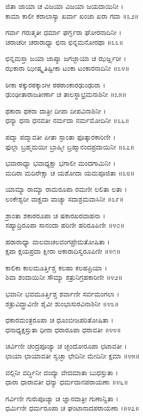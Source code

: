 ಜಿತಾ ಜಾಯಾ ಚ ವಿಜಯಾ ವಿಜಯಾ ಜಯದಾಯಿನೀ ।\\
ಕಾಮಾ ಕಾಲೀ ಕರಾಲಾಸ್ಯಾ ಖರ್ವಾ ಖಂಜಾ ಖರಾ ಗದಾ ॥೩೨॥

ಗರ್ವಾ ಗರುತ್ಮತೀ ಧರ್ಮಾ ಘರ್ಗ್ಘರಾ ಘೋರನಾದಿನೀ ।\\
ಚರಾಚರೀ ಚರಾರಾಧ್ಯಾ ಛಿನಾ ಛಿನ್ನಮನೋರಥಾ ॥೩೩॥

ಛಿನ್ನಮಸ್ತಾ ಜಯಾ ಜಾಪ್ಯಾ ಜಗಜ್ಜಾಯಾ ಚ ಝರ್ಜ್ಝರೀ ।\\
ಝಕಾರಾ ಝೀಷ್ಕೃತಿಷ್ಟೀಕಾ ಟಂಕಾ ಟಂಕಾರನಾದಿನೀ ॥೩೪॥

ಠೀಕಾ ಠಕ್ಕುರಠಕ್ಕಾಂಗೀ ಠಠಠಾಂಕಾರಢುಂಢುರಾ ।\\
ಢುಂಢೀತಾರಾಜತೀರ್ಣಾ ಚ ತಾಲಸ್ಥಾಭ್ರಮನಾಶಿನೀ ॥೩೫॥

ಥಕಾರಾ ಥಕರಾ ದಾತ್ರೀ ದೀಪಾ ದೀಪವಿನಾಶಿನೀ ।\\
ಧನ್ಯಾ ಧನಾ ಧನವತೀ ನರ್ಮದಾ ನರ್ಮಮೋದಿನೀ ॥೩೬॥

ಪದ್ಮಾ ಪದ್ಮಾವತೀ ಪೀತಾ ಸ್ಫಾಂತಾ ಫೂತ್ಕಾರಕಾರಿಣೀ ।\\
ಫುಲ್ಲಾ ಬ್ರಹ್ಮಮಯೀ ಬ್ರಾಹ್ಮೀ ಬ್ರಹ್ಮಾನಂದಪ್ರದಾಯಿನೀ ॥೩೭॥

ಭವಾರಾಧ್ಯಾ ಭವಾಧ್ಯಕ್ಷಾ ಭಗಾಲೀ ಮಂದಗಾಮಿನೀ ।\\
ಮದಿರಾ ಮದಿರೇಕ್ಷಾ ಚ ಯಶೋದಾ ಯಮಪೂಜಿತಾ ॥೩೮॥

ಯಾಮ್ಯಾ ರಾಮ್ಯಾ ರಾಮರೂಪಾ ರಮಣೀ ಲಲಿತಾ ಲತಾ ।\\
ಲಂಕೇಶ್ವರೀ ವಾಕ್ಪ್ರದಾ ವಾಚ್ಯಾ ಸದಾಶ್ರಮವಾಸಿನೀ ॥೩೯॥

ಶ್ರಾಂತಾ ಶಕಾರರೂಪಾ ಚ ಷಕಾರಖರವಾಹನಾ ।\\
ಸಹ್ಯಾದ್ರಿರೂಪಾ ಸಾನಂದಾ ಹರಿಣೀ ಹರಿರೂಪಿಣೀ ॥೪೦॥

ಹರಾರಾಧ್ಯಾ ವಾಲವಾಚಲವಂಗಪ್ರೇಮತೋಷಿತಾ ।\\
ಕ್ಷಪಾ ಕ್ಷಯಪ್ರದಾ ಕ್ಷೀರಾ ಅಕಾರಾದಿಸ್ವರೂಪಿಣೀ ॥೪೧॥

ಕಾಲಿಕಾ ಕಾಲಮೂರ್ತ್ತಿಶ್ಚ ಕಲಹಾ ಕಲಹಪ್ರಿಯಾ ।\\
ಶಿವಾ ಶಂದಾಯಿನೀ ಸೌಮ್ಯಾ ಶತ್ರುನಿಗ್ರಹಕಾರಿಣೀ ॥೪೨॥

ಭವಾನೀ ಭವಮೂರ್ತ್ತಿಶ್ಚ ಶರ್ವಾಣೀ ಸರ್ವಮಂಗಲಾ ।\\
ಶತ್ರುವಿದ್ದ್ರಾವಿಣೀ ಶೈವೀ ಶುಂಭಾಸುರವಿನಾಶಿನೀ ॥೪೩॥

ಧಕಾರಮಂತ್ರರೂಪಾ ಚ ಧೂಂಬೀಜಪರಿತೋಷಿತಾ ।\\
ಧನಾಧ್ಯಕ್ಷಸ್ತುತಾ ಧೀರಾ ಧರಾರೂಪಾ ಧರಾವತೀ ॥೪೪॥

ಚರ್ವಿಣೀ ಚಂದ್ರಪೂಜ್ಯಾ ಚ ಚ್ಛಂದೋರೂಪಾ ಛಟಾವತೀ ।\\
ಛಾಯಾ ಛಾಯಾವತೀ ಸ್ವಚ್ಛಾ ಛೇದಿನೀ ಮೇದಿನೀ ಕ್ಷಮಾ ॥೪೫॥

ವಲ್ಗಿನೀ ವರ್ದ್ಧಿನೀ ವಂದ್ಯಾ ವೇದಮಾತಾ ಬುಧಸ್ತುತಾ ।\\
ಧಾರಾ ಧಾರಾವತೀ ಧನ್ಯಾ ಧರ್ಮದಾನಪರಾಯಣಾ ॥೪೬॥

ಗರ್ವಿಣೀ ಗುರುಪೂಜ್ಯಾ ಚ ಜ್ಞಾನದಾತ್ರೀ ಗುಣಾನ್ವಿತಾ ।\\
ಧರ್ಮಿಣೀ ಧರ್ಮರೂಪಾ ಚ ಘಂಟಾನಾದಪರಾಯಣಾ ।॥೪೭॥

